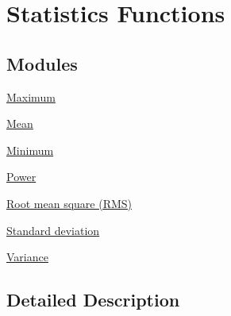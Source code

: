 \hypertarget{group__group_stats}{\section{Statistics Functions}
\label{group__group_stats}
}
\subsection*{Modules}
\begin{DoxyCompactItemize}
\item 
\hyperlink{group___max}{Maximum}
\item 
\hyperlink{group__mean}{Mean}
\item 
\hyperlink{group___min}{Minimum}
\item 
\hyperlink{group__power}{Power}
\item 
\hyperlink{group___r_m_s}{Root mean square (\-R\-M\-S)}
\item 
\hyperlink{group___s_t_d}{Standard deviation}
\item 
\hyperlink{group__variance}{Variance}
\end{DoxyCompactItemize}


\subsection{Detailed Description}
